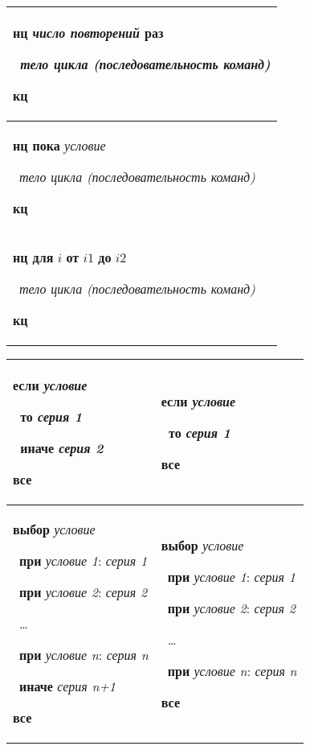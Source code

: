 \documentclass[12pt,a4paper]{article}
\newcommand{\otstup}{\textperiodcentered\ }
\begin{document}
\begin{center}
\begin{tabular}{||p{10cm}||}
\hline
\hline
\textbf{нц} \textit{число повторений} \textbf{раз}

\otstup \textit{тело цикла (последовательность команд)}

\textbf{кц}\\
\hline
\textbf{нц пока} \textit{условие}

\otstup \textit{тело цикла (последовательность команд)}

\textbf{кц}\\
\hline
\textbf{нц для} $i$ \textbf{от} $i1$ \textbf{до} $i2$ 

\otstup \textit{тело цикла (последовательность команд)}

\textbf{кц}\\
\hline
\hline
\end{tabular}
\vspace{1ex}

\begin{tabular}{||p{6cm}|p{6cm}||}
\hline
\hline
\textbf{если} \textit{условие}

\otstup \textbf{то} \textit{серия 1}

\otstup \textbf{иначе} \textit{серия 2}

\textbf{все} &
\textbf{если} \textit{условие}

\otstup \textbf{то} \textit{серия 1}

\textbf{все}\\
\hline
\textbf{выбор} \textit{условие}

\otstup \textbf{при} \textit{условие 1}: \textit{серия 1}

\otstup \textbf{при} \textit{условие 2}: \textit{серия 2}

\otstup \dots

\otstup \textbf{при} \textit{условие n}: \textit{серия n}

\otstup \textbf{иначе} \textit{серия n+1}

\textbf{все} &
\textbf{выбор} \textit{условие}

\otstup \textbf{при} \textit{условие 1}: \textit{серия 1}

\otstup \textbf{при} \textit{условие 2}: \textit{серия 2}

\otstup \dots

\otstup \textbf{при} \textit{условие n}: \textit{серия n}

\textbf{все}\\
\hline
\hline
\end{tabular}
\vspace{1ex}


\end{center}
\end{document}
